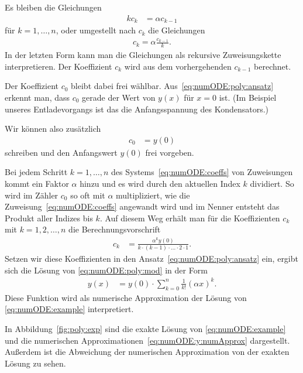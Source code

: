 \documentclass{article}
\begin{document}
Es bleiben die Gleichungen
\begin{align*}
  k c_k &= \alpha c_{k-1}
\end{align*}
für $k=1,\ldots,n$, oder umgestellt nach $c_k$ die Gleichungen
\begin{align}
  c_k = \alpha\frac{c_{k-1}}k.
  \label{eq:numODE:coeffs}
\end{align}
In der letzten Form kann man die Gleichungen als rekursive
Zuweisungskette interpretieren. Der Koeffizient $c_k$ wird aus dem
vorhergehenden $c_{k-1}$ berechnet.

Der Koeffizient $c_0$ bleibt dabei frei
wählbar. Aus~\eqref{eq:numODE:poly:ansatz} erkennt man, dass $c_0$ gerade der
Wert von $y(x)$ für $x=0$ ist. (Im Beispiel unseres Entladevorgangs
ist das die Anfangsspannung des Kondensators.)

Wir können also zusätzlich 
\begin{align*}
  c_0 &= y(0)
\end{align*}
schreiben und den Anfangswert $y(0)$ frei vorgeben.

Bei jedem Schritt $k=1,\ldots,n$ des Systems~\eqref{eq:numODE:coeffs}
von Zuweisungen kommt ein Faktor $\alpha$ hinzu und es wird durch den
aktuellen Index $k$ dividiert. So wird im Zähler $c_0$ so oft mit
$\alpha$ multipliziert, wie die Zuweisung~\eqref{eq:numODE:coeffs}
angewandt wird und im Nenner entsteht das Produkt aller Indizes bis
$k$.  Auf diesem Weg erhält man für die Koeffizienten $c_k$ mit
$k=1,2,\ldots,n$ die Berechnungsvorschrift
\begin{align*}
  c_k &= \frac{\alpha^k y(0)}{k\cdot(k-1)\cdot\ldots\cdot 2\cdot 1}.
\end{align*}
Setzen wir diese Koeffizienten in den
Ansatz~\eqref{eq:numODE:poly:ansatz} ein, ergibt sich die Lösung von \eqref{eq:numODE:poly:mod} in der Form
\begin{align}
  y(x) &= y(0)\cdot\sum_{k=0}^{n} \frac{1}{k!} (\alpha x)^k.
         \label{eq:numODE:y:numApprox}
\end{align}
Diese Funktion wird als numerische Approximation der Lösung von \eqref{eq:numODE:example} interpretiert.

In Abbildung~\ref{fig:poly:exp} sind die exakte Lösung von \eqref{eq:numODE:example} und die numerischen Approximationen~\eqref{eq:numODE:y:numApprox} dargestellt. Außerdem ist die Abweichung der numerischen Approximation von der exakten Lösung zu sehen.
\end{document}
